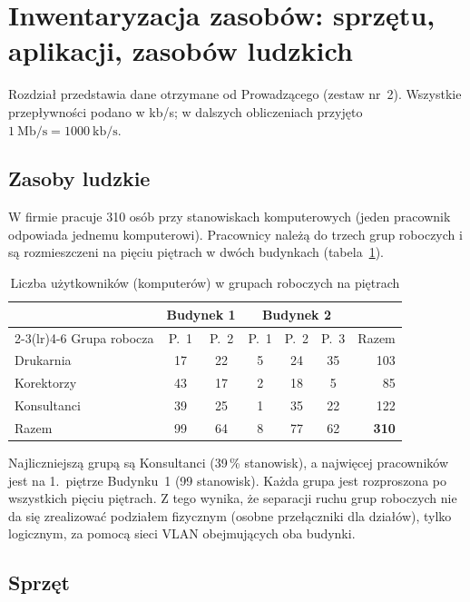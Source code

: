 \documentclass[12pt,a4paper]{article}
\begin{document}
\section{Inwentaryzacja zasobów: sprzętu, aplikacji, zasobów ludzkich}

Rozdział przedstawia dane otrzymane od Prowadzącego (zestaw nr~2). Wszystkie
przepływności podano w kb/s; w dalszych obliczeniach przyjęto
$1~\text{Mb/s} = 1000~\text{kb/s}$.

\subsection{Zasoby ludzkie}

W firmie pracuje 310 osób przy stanowiskach komputerowych (jeden pracownik
odpowiada jednemu komputerowi). Pracownicy należą do trzech grup roboczych
i są rozmieszczeni na pięciu piętrach w dwóch budynkach
(tabela~\ref{tab:uzytkownicy}).

\begin{table}[htbp]
\centering
\caption{Liczba użytkowników (komputerów) w grupach roboczych na piętrach}
\label{tab:uzytkownicy}
\begin{tabular}{lcccccr}
\toprule
 & \multicolumn{2}{c}{Budynek 1} & \multicolumn{3}{c}{Budynek 2} & \\
\cmidrule(lr){2-3}\cmidrule(lr){4-6}
Grupa robocza & P.~1 & P.~2 & P.~1 & P.~2 & P.~3 & Razem \\
\midrule
Drukarnia   & 17 & 22 & 5 & 24 & 35 & 103 \\
Korektorzy  & 43 & 17 & 2 & 18 &  5 &  85 \\
Konsultanci & 39 & 25 & 1 & 35 & 22 & 122 \\
\midrule
Razem       & 99 & 64 & 8 & 77 & 62 & \textbf{310} \\
\bottomrule
\end{tabular}
\end{table}

Najliczniejszą grupą są Konsultanci (39\,\% stanowisk), a najwięcej
pracowników jest na 1.~piętrze Budynku~1 (99 stanowisk). Każda grupa jest
rozproszona po wszystkich pięciu piętrach. Z tego wynika, że separacji ruchu
grup roboczych nie da się zrealizować podziałem fizycznym (osobne
przełączniki dla działów), tylko logicznym, za pomocą sieci VLAN obejmujących
oba budynki.

\subsection{Sprzęt}
\end{document}
